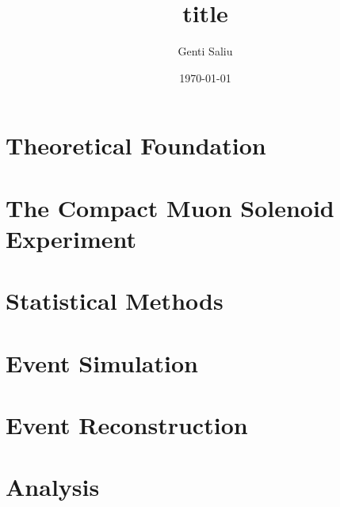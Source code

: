 \documentclass[a4paper,11pt,twoside,DIV=calc,BCOR12.5mm,headsepline,titlepage,openright,final,english]{scrbook}
\title{title}
\author{Genti Saliu}
\date{\today}
\begin{document}

\cleardoublepage

\frontmatter


\cleardoublepage


\cleardoublepage


\cleardoublepage
  
\mainmatter


\cleardoublepage

\setcounter{tocdepth}{2}
\tableofcontents

\renewcommand{\arraystretch}{1.2}

\chapter{Theoretical Foundation}
\label{ch:theory}


\chapter{The Compact Muon Solenoid Experiment}
\label{ch:cms}


\chapter{Statistical Methods}
\label{ch:stat}


\chapter{Event Simulation}
\label{ch:simulation}


\chapter{Event Reconstruction}
\label{ch:reconstruction}


\chapter{Analysis}
\label{ch:analysis}




\appendix




\listoftables
\listoffigures




\backmatter


 
\end{document}
